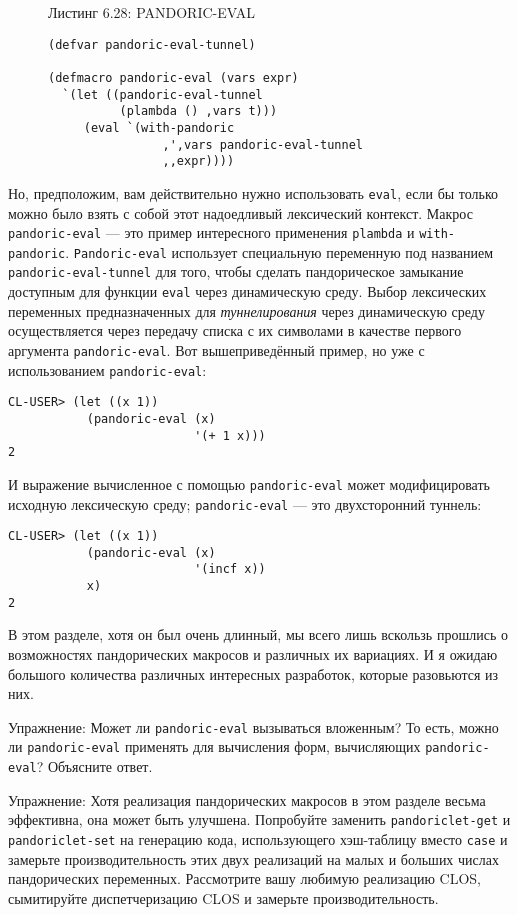 \begin{figure}Листинг 6.28: PANDORIC-EVAL\label{listing_6.28}
\listbegin
\begin{verbatim}
(defvar pandoric-eval-tunnel)

(defmacro pandoric-eval (vars expr)
  `(let ((pandoric-eval-tunnel
          (plambda () ,vars t)))
     (eval `(with-pandoric
                ,',vars pandoric-eval-tunnel
                ,,expr))))
\end{verbatim}
\listend
\end{figure}

Но, предположим, вам действительно нужно использовать \verb"eval", если бы только можно было взять с собой этот надоедливый лексический контекст. Макрос \verb"pandoric-eval" --- это пример интересного применения \verb"plambda" и \verb"with-pandoric". \verb"Pandoric-eval" использует специальную переменную под названием \verb"pandoric-eval-tunnel" для того, чтобы сделать пандорическое замыкание доступным для функции \verb"eval" через динамическую среду. Выбор лексических переменных предназначенных для \emph{туннелирования} через динамическую среду осуществляется через передачу списка с их символами в качестве первого аргумента \verb"pandoric-eval". Вот вышеприведённый пример, но уже с использованием \verb"pandoric-eval":

\begin{verbatim}
CL-USER> (let ((x 1))
           (pandoric-eval (x)
                          '(+ 1 x)))
2
\end{verbatim}

И выражение вычисленное с помощью \verb"pandoric-eval" может модифицировать исходную лексическую среду; \verb"pandoric-eval" --- это двухсторонний туннель:

\begin{verbatim}
CL-USER> (let ((x 1))
           (pandoric-eval (x)
                          '(incf x))
           x)
2
\end{verbatim}

В этом разделе, хотя он был очень длинный, мы всего лишь вскользь прошлись о возможностях пандорических макросов и различных их вариациях. И я ожидаю большого количества различных интересных разработок, которые разовьются из них.

Упражнение: Может ли \verb"pandoric-eval" вызываться вложенным? То есть, можно ли \verb"pandoric-eval" применять для вычисления форм, вычисляющих \verb"pandoric-eval"? Объясните ответ.

Упражнение: Хотя реализация пандорических макросов в этом разделе весьма эффективна, она может быть улучшена. Попробуйте заменить \verb"pandoriclet-get" и \verb"pandoriclet-set" на генерацию кода, использующего хэш-таблицу вместо \verb"case" и замерьте производительность этих двух реализаций на малых и больших числах пандорических переменных. Рассмотрите вашу любимую реализацию CLOS, сымитируйте диспетчеризацию CLOS и замерьте производительность.
